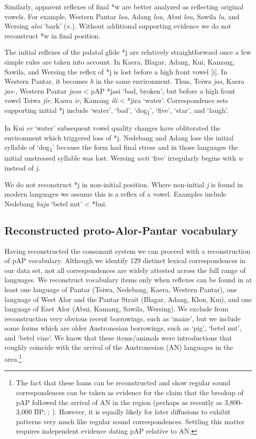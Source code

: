 Similarly, apparent reflexes of final *w are better analyzed as reflecting original vowels. For example, Western Pantar \textit{lau}, Adang \textit{lou,} Abui \textit{lou}, Sawila \textit{lu}, and Wersing \textit{aloi} `bark' (v.). Without additional supporting evidence we do not reconstruct *w in final position.

The initial reflexes of the palatal glide *j are relatively straightforward once a few simple rules are taken into account. In Kaera, Blagar, Adang, Kui, Kamang, Sawila, and Wersing the reflex of *j is lost before a high front vowel [i]. In Western Pantar, it becomes \textit{h} in the same environment. Thus, Teiwa \textit{jas}, Kaera \textit{jas-}, Western Pantar \textit{jasa} {\textless} pAP *jasi `bad, broken'; but before a high front vowel Teiwa \textit{jir}, Kaera \textit{ir}, Kamang \textit{ili }{\textless} *jira `water'. Correspondence sets supporting initial *j include `water', `bad', `dog\textsubscript{1}', `five', `star', and `laugh'.

In Kui \textit{e{\textlengthmark}r }`water' subsequent vowel quality changes have obliterated the environment which triggered loss of *j. Nedebang and Adang lose the initial syllable of `dog\textsubscript{1}' because the form had final stress and in those languages the initial unstressed syllable was lost. Wersing \textit{weti{\ng}} `five' irregularly begins with \textit{w} instead of \textit{j}.

We do not reconstruct *j in non-initial position. Where non-initial \textit{j }is found in modern languages we assume this is a reflex of a vowel. Examples include Nedebang \textit{buja} `betel nut' {\textless} *bui.

\subsection{ Reconstructed proto-Alor-Pantar vocabulary}
Having reconstructed the consonant system we can proceed with a reconstruction of pAP vocabulary. Although we identify 129 distinct lexical correspondences in our data set, not all correspondences are widely attested across the full range of languages. We reconstruct vocabulary items only when reflexes can be found in at least one language of Pantar (Teiwa, Nedebang, Kaera, Western Pantar), one language of West Alor and the Pantar Strait (Blagar, Adang, Klon, Kui), and one language of East Alor (Abui, Kamang, Sawila, Wersing). We exclude from reconstruction very obvious recent borrowings, such as `maize', but we include some forms which are older Austronesian borrowings, such as `pig', `betel nut', and `betel vine'. We know that these items/animals were introductions that roughly coincide with the arrival of the Austronesian (AN) languages in the area.\footnote{ The fact that these loans can be reconstructed and show regular sound correspondences can be taken as evidence for the
claim that the breakup of pAP followed the arrival of AN in the region (perhaps as recently as 3,800-3,000 BP; \citet[511]{Spriggs2011}; \citet[100]{Pawley2005}). However, it is equally likely for later diffusions to exhibit patterns very much like regular sound correspondences. Settling this matter requires independent evidence dating pAP relative to AN.}

